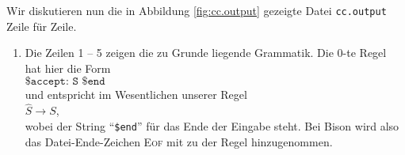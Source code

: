 Wir diskutieren nun die in Abbildung \ref{fig:cc.output} gezeigte Datei \texttt{cc.output}
Zeile f\"ur Zeile.
\begin{enumerate}
\item Die Zeilen 1 -- 5 zeigen die zu Grunde liegende Grammatik.  Die 0-te Regel hat hier
      die Form
      \\[0.2cm]
      \hspace*{1.3cm}
      $\texttt{\$accept: S \$end}$
      \\[0.2cm]
      und entspricht im Wesentlichen unserer Regel
      \\[0.2cm]
      \hspace*{1.3cm}
      $\widehat{S} \rightarrow S$,
      \\[0.2cm]
      wobei der String ``\texttt{\$end}''
      f\"ur das Ende der Eingabe steht.  Bei Bison wird also das Datei-Ende-Zeichen
      \textsc{Eof} mit zu der Regel hinzugenommen.


\end{enumerate}
